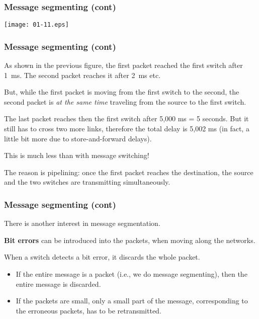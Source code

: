 %
\begin{frame}
\frametitle{Message segmenting (cont)}

\begin{center}
\texttt{[image: 01-11.eps]}
\end{center}

\end{frame}

%
\begin{frame}
\frametitle{Message segmenting (cont)}

As shown in the previous figure, the first packet reached the first
switch after 1~ms. The second packet reaches it after 2~ms etc.

\bigskip

But, while the first packet is moving from the first switch to the
second, the second packet is \emph{at the same time} traveling from
the source to the first switch.

\bigskip

The last packet reaches then the first switch after 5,000 ms = 5
seconds. But it still has to cross two more links, therefore the
total delay is 5,002 ms (in fact, a little bit more due to
store-and-forward delays).

\bigskip

This is much less than with message switching! 

\bigskip

The reason is pipelining: once the first packet reaches the
destination, the source and the two switches are transmitting
simultaneously. 

\end{frame}

%
\begin{frame}
\frametitle{Message segmenting (cont)}

There is another interest in message segmentation.

\bigskip

\textbf{Bit errors} can be introduced into the packets, when moving
along the networks.

\bigskip

When a switch detects a bit error, it discards the whole packet.
\begin{itemize}

  \item If the entire message is a packet (i.e., we do message
  segmenting), then the entire message is discarded.

  \item If the packets are small, only a small part of the message,
  corresponding to the erroneous packets, has to be retransmitted.

\end{itemize}

\end{frame}


